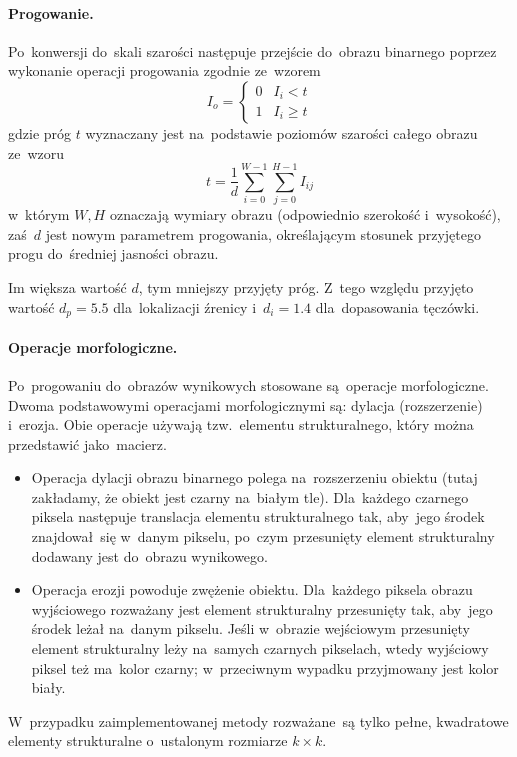 \documentclass[11pt,a4paper]{article}
\begin{document}
\paragraph{Progowanie.}
Po~konwersji do~skali szarości następuje przejście do~obrazu binarnego poprzez wykonanie operacji progowania zgodnie ze~wzorem
$$ I_o = \begin{cases}
    0 & I_i < t \\
    1 & I_i \geq t
\end{cases} $$
gdzie próg $t$ wyznaczany jest na~podstawie poziomów szarości całego obrazu ze~wzoru
$$ t = \frac{1}{d} \sum_{i = 0}^{W - 1} \sum_{j = 0}^{H - 1} I_{ij} $$
w~którym $W, H$ oznaczają wymiary obrazu (odpowiednio szerokość i~wysokość), zaś~$d$ jest nowym parametrem progowania, określającym stosunek przyjętego progu do~średniej jasności obrazu.

Im większa wartość $d$, tym mniejszy przyjęty próg.
Z~tego względu przyjęto wartość $d_p = 5.5$ dla~lokalizacji źrenicy i~$d_i = 1.4$ dla~dopasowania tęczówki.

\paragraph{Operacje morfologiczne.}
Po~progowaniu do~obrazów wynikowych stosowane są~operacje morfologiczne.
Dwoma podstawowymi operacjami morfologicznymi są: dylacja (rozszerzenie) i~erozja.
Obie operacje używają tzw.~elementu strukturalnego, który można przedstawić jako~macierz.
\begin{itemize}
    \item Operacja dylacji obrazu binarnego polega na~rozszerzeniu obiektu (tutaj zakładamy, że obiekt jest czarny na~białym tle).
    Dla~każdego czarnego piksela następuje translacja elementu strukturalnego tak, aby~jego środek znajdował~się w~danym pikselu, po~czym przesunięty element strukturalny dodawany jest do~obrazu wynikowego.
    \item Operacja erozji powoduje zwężenie obiektu.
    Dla~każdego piksela obrazu wyjściowego rozważany jest element strukturalny przesunięty tak, aby~jego środek leżał na~danym pikselu.
    Jeśli w~obrazie wejściowym przesunięty element strukturalny leży na~samych czarnych pikselach, wtedy wyjściowy piksel też ma~kolor czarny; w~przeciwnym wypadku przyjmowany jest kolor biały.
\end{itemize}
W~przypadku zaimplementowanej metody rozważane~są tylko pełne, kwadratowe elementy strukturalne o~ustalonym rozmiarze $k \times k$.
\end{document}
